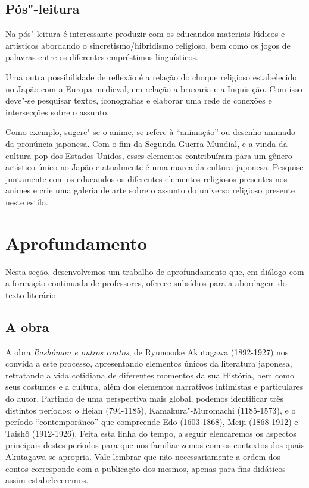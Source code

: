 \documentclass[12pt]{extarticle}
\begin{document}
\subsection{Pós"-leitura}

Na pós"-leitura é interessante produzir com os educandos materiais lúdicos e
artísticos abordando o sincretismo/hibridismo religioso, bem como os jogos de
palavras entre os diferentes empréstimos linguísticos.

Uma outra possibilidade de reflexão é a relação do choque religioso
estabelecido no Japão com a Europa medieval, em relação a bruxaria e a
Inquisição. Com isso deve"-se pesquisar textos, iconografias e elaborar uma
rede de conexões e intersecções sobre o assunto.

Como exemplo, sugere"-se o anime, se refere à ``animação'' ou desenho animado
da pronúncia japonesa. Com o fim da Segunda Guerra Mundial, e a vinda da
cultura pop dos Estados Unidos, esses elementos contribuíram para um gênero
artístico único no Japão e atualmente é uma marca da cultura japonesa. Pesquise
juntamente com os educandos os diferentes elementos religiosos presentes nos
animes e crie uma galeria de arte sobre o assunto do universo religioso
presente neste estilo.


\section{Aprofundamento}

Nesta seção, desenvolvemos um trabalho de aprofundamento que, em diálogo com a
formação continuada de professores, oferece subsídios para a abordagem do texto
literário.

\subsection{A obra}

A obra \emph{Rashômon e outros contos}, de Ryunosuke Akutagawa (1892-1927) nos
convida a este processo, apresentando elementos únicos da literatura japonesa,
retratando a vida cotidiana de diferentes momentos da sua História, bem como
seus costumes e a cultura, além dos elementos narrativos intimistas e
particulares do autor. Partindo de uma perspectiva mais global, podemos
identificar três distintos períodos: o Heian (794-1185), Kamakura"-Muromachi
(1185-1573), e o período ``contemporâneo'' que compreende Edo (1603-1868),
Meiji (1868-1912) e Taishô (1912-1926). Feita esta linha do tempo, a seguir
elencaremos os aspectos principais destes períodos para que nos familiarizemos
com os contextos dos quais Akutagawa se apropria. Vale lembrar que não
necessariamente a ordem dos contos corresponde com a publicação dos mesmos,
apenas para fins didáticos assim estabeleceremos.
\end{document}
